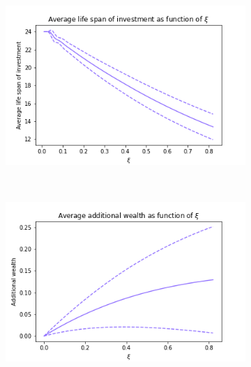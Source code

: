 \documentclass{article}
\begin{document}
\begin{figure}[b!]
     \centering
     \hfill
     \begin{subfigure}[b]{\textwidth}
         \centering
         \includegraphics[scale=.7]{png/average_life_span_W0=1_r=0.0004166666666666667_m=0.02592451988463669_sigma=0.06164058158266796_K=24_S=100000.png}
         \caption{}
         \label{fig:average-final-wealth-zero-life-span}
     \end{subfigure}
     \\
     \begin{subfigure}[b]{\textwidth}
         \centering
         \includegraphics[scale=.7]{png/additional_wealth_W0=1_r=0.0004166666666666667_m=0.02592451988463669_sigma=0.06164058158266796_K=24_S=100000.png}
         \caption{}
         \label{fig:average-final-wealth-zero-additional wealth}
     \end{subfigure}
     \\
     \begin{subfigure}[b]{\textwidth}
         \centering

\end{subfigure}
\end{figure}
\end{document}

